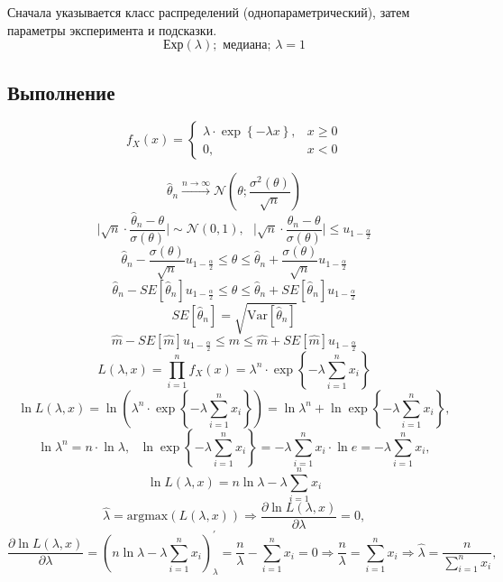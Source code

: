 \documentclass[a4paper, 12pt]{article}
\begin{document}
    
    Сначала указывается класс распределений (однопараметрический),
    затем параметры эксперимента и подсказки.
    $$\text{Ехр}(\lambda);\text{ медиана};\,\lambda=1$$


    \subsection{Выполнение}
    $$f_X(x)=
    \begin{cases}
        \lambda\cdot\exp{\left\{-\lambda x\right\}},& x\geq0\\
        0,& x < 0
    \end{cases}$$


    $$\hat{\theta}_n\xrightarrow{n\to\infty}\mathcal{N}\left(\theta;\dfrac{\sigma^2\left(\theta\right)}{\sqrt{n}}\right)$$
    $$\Bigg|\sqrt{n}\cdot\dfrac{\hat{\theta}_n-\theta}{\sigma\left(\theta\right)}\Bigg|\sim\mathcal{N}\left(0,1\right),\,\,\,\, \Bigg|\sqrt{n}\cdot\dfrac{\hat{\theta}_n-\theta}{\sigma\left(\theta\right)}\Bigg|\leq u_{1-\frac{\alpha}{2}}$$
    $$\hat{\theta}_n-\dfrac{\sigma\left(\theta\right)}{\sqrt{n}}u_{1-\frac{\alpha}{2}}\leq\theta\leq\hat{\theta}_n+\dfrac{\sigma\left(\theta\right)}{\sqrt{n}}u_{1-\frac{\alpha}{2}}$$
    $$\hat{\theta}_n-SE\left[\hat{\theta}_n\right]u_{1-\frac{\alpha}{2}}\leq\theta\leq\hat{\theta}_n+SE\left[\hat{\theta}_n\right]u_{1-\frac{\alpha}{2}}$$
    $$SE\left[\hat{\theta}_n\right]=\sqrt{\text{Var}\left[\hat{\theta}_n\right]}$$
    $$\hat{m}-SE\left[\hat{m}\right]u_{1-\frac{\alpha}{2}}\leq m\leq\hat{m}+SE\left[\hat{m}\right]u_{1-\frac{\alpha}{2}}$$
    $$L\left(\lambda,x\right)=\prod_{i=1}^{n}f_X\left(x\right)=\lambda^n\cdot\exp{\left\{-\lambda\sum\limits_{i=1}^{n}x_i\right\}}$$
    $$\ln{L\left(\lambda,x\right)}=\ln{\left(\lambda^n\cdot\exp{\left\{-\lambda\sum\limits_{i=1}^{n}x_i\right\}}\right)}=
    \ln{\lambda^n}+\ln{\exp{\left\{-\lambda\sum\limits_{i=1}^{n}x_i\right\}}},$$
    $$\ln{\lambda^n}=n\cdot\ln{\lambda},\,\,\,\,\ln{\exp{\left\{-\lambda\sum\limits_{i=1}^{n}x_i\right\}}}=-\lambda\sum\limits_{i=1}^{n}x_i\cdot\ln{e}=-\lambda\sum\limits_{i=1}^{n}x_i,$$
    $$\ln{L\left(\lambda,x\right)}=n\ln{\lambda}-\lambda\sum\limits_{i=1}^{n}x_i$$
    $$\hat{\lambda}=\text{argmax}\left(L\left(\lambda,x\right)\right)\Rightarrow \dfrac{\partial\ln{L\left(\lambda,x\right)}}{\partial\lambda}=0,$$
    $$\dfrac{\partial\ln{L\left(\lambda,x\right)}}{\partial\lambda}=\left(n\ln{\lambda}-\lambda\sum\limits_{i=1}^{n}x_i\right)_{\lambda}^{\prime}=
    \dfrac{n}{\lambda}-\sum\limits_{i=1}^{n}x_i=0\Rightarrow\dfrac{n}{\lambda}=\sum\limits_{i=1}^{n}x_i\Rightarrow\hat{\lambda}=\dfrac{n}{\sum_{i=1}^{n}x_i},$$
\end{document}
